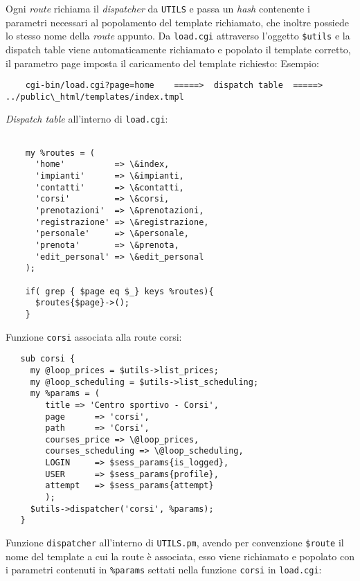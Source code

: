 Ogni \textit{route} richiama il \textit{dispatcher} da \texttt{UTILS} e passa un \textit{hash} contenente i parametri necessari al popolamento del template richiamato, che inoltre possiede lo stesso nome della \textit{route} appunto.\newline
Da \texttt{load.cgi} attraverso l'oggetto \texttt{\$utils} e la dispatch table viene automaticamente richiamato e popolato il template corretto, il parametro page imposta il caricamento del template richiesto: \newline \newline
Esempio:
\scriptsize{
  \begin{verbatim}
    cgi-bin/load.cgi?page=home    =====>  dispatch table  =====>  ../public\_html/templates/index.tmpl
  \end{verbatim}
}

\small{\textit{Dispatch table} all'interno di \texttt{load.cgi}:}


\scriptsize{
\begin{verbatim}

    my %routes = (
      'home'          => \&index,
      'impianti'      => \&impianti,
      'contatti'      => \&contatti,
      'corsi'         => \&corsi,
      'prenotazioni'  => \&prenotazioni,
      'registrazione' => \&registrazione,
      'personale'     => \&personale,
      'prenota'       => \&prenota,
      'edit_personal' => \&edit_personal
    );

    if( grep { $page eq $_} keys %routes){
      $routes{$page}->();
    }

\end{verbatim}
}

\small{Funzione \texttt{corsi} associata alla route corsi:}

\scriptsize{
\begin{verbatim}
   sub corsi {
     my @loop_prices = $utils->list_prices;
     my @loop_scheduling = $utils->list_scheduling;
     my %params = (
        title => 'Centro sportivo - Corsi',
        page      => 'corsi',
        path      => 'Corsi',
        courses_price => \@loop_prices,
        courses_scheduling => \@loop_scheduling,
        LOGIN     => $sess_params{is_logged},
        USER      => $sess_params{profile},
        attempt   => $sess_params{attempt}
        );
     $utils->dispatcher('corsi', %params);
   }
\end{verbatim}
}
\small{Funzione \texttt{dispatcher} all'interno di \texttt{UTILS.pm}, avendo per convenzione \texttt{\$route} il nome del template a cui la route è associata, esso viene richiamato e popolato con i parametri contenuti in \texttt{\%params} settati nella funzione \texttt{corsi} in \texttt{load.cgi}:}
 
